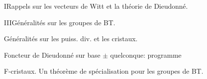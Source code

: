 
I\quad Rappels sur les vecteurs de Witt et  la théorie de Dieudonné.

III\quad Généralités sur les groupes de BT.

\quad Généralités sur les puiss. div. et les cristaux.

\quad Foncteur de Dieudonné sur base $\pm$ quelconque: programme 

\quad F-cristaux. Un théorème de spécialisation pour les groupes de BT.
